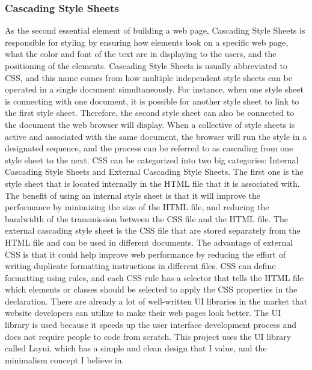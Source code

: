 \documentclass[10pt,twocolumn]{article}
\begin{document}
\subsubsection{Cascading Style Sheets}
As the second essential element of building a web page, Cascading Style Sheets is responsible for styling by ensuring how elements look on a specific web page, what the color and font of the text are in displaying to the users, and the positioning of the elements. Cascading Style Sheets is usually abbreviated to CSS, and this name comes from how multiple independent style sheets can be operated in a single document simultaneously. For instance, when one style sheet is connecting with one document, it is possible for another style sheet to link to the first style sheet. Therefore, the second style sheet can also be connected to the document the web browser will display. When a collective of style sheets is active and associated with the same document, the browser will run the style in a designated sequence, and the process can be referred to as cascading from one style sheet to the next.
\newline
\indent
 CSS can be categorized into two big categories: Internal Cascading Style Sheets and External Cascading Style Sheets\cite{Fitzgerald2021}. The first one is the style sheet that is located internally in the HTML file that it is associated with. The benefit of using an internal style sheet is that it will improve the performance by minimizing the size of the HTML file, and reducing the bandwidth of the transmission between the CSS file and the HTML file. The external cascading style sheet is the CSS file that are stored separately from the HTML file and can be used in different documents. The advantage of external CSS is that it could help improve web performance by reducing the effort of writing duplicate formatting instructions in different files. CSS can define formatting using rules, and each CSS rule has a selector that tells the HTML file which elements or classes should be selected to apply the CSS properties in the declaration.
\newline
\indent
There are already a lot of well-written UI libraries in the market that website developers can utilize to make their web pages look better. The UI library is used because it speeds up the user interface development process and does not require people to code from scratch. This project uses the UI library called Layui, which has a simple and clean design that I value, and the minimalism concept I believe in.
\end{document}
